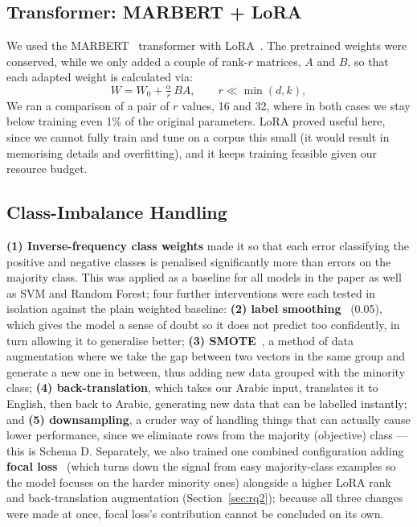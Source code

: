 \documentclass[conference]{IEEEtran}
\begin{document}
\subsection{Transformer: MARBERT + LoRA}
We used the MARBERT~\cite{abdulmageed2021marbert} transformer with LoRA~\cite{hu2022lora}.
The pretrained weights were conserved, while we only added a couple of rank-$r$ matrices,
$A$ and $B$, so that each adapted weight is calculated via:
\begin{equation}
  W = W_0 + \tfrac{\alpha}{r}\,BA, \qquad r \ll \min(d,k),
  \label{eq:lora}
\end{equation}
We ran a comparison of a pair of $r$ values, 16 and 32, where in both cases
we stay below training even 1\% of the original parameters. LoRA proved useful here,
since we cannot fully train and tune on a corpus this small (it would result in memorising
details and overfitting), and it keeps training feasible given our resource budget.

\subsection{Class-Imbalance Handling}
\label{sec:imbalance}
\textbf{(1) Inverse-frequency class weights} made it so that each error classifying the
positive and negative classes is penalised significantly more than errors on the majority class.
This was applied as a baseline for all models in the paper as well as SVM and Random Forest; four further
interventions were each tested in isolation against the plain weighted baseline:
\textbf{(2) label smoothing}~\cite{muller2019labelsmoothing} (0.05), which gives the
model a sense of doubt so it does not predict too confidently, in turn allowing it to generalise better;
\textbf{(3) SMOTE}~\cite{chawla2002smote}, a method of data augmentation where we take the gap between
two vectors in the same group and generate a new one in between, thus adding new data grouped
with the minority class; \textbf{(4) back-translation}, which takes our Arabic input, translates
it to English, then back to Arabic, generating new data that can be labelled instantly; and
\textbf{(5) downsampling}, a cruder way of handling things that can actually cause lower
performance, since we eliminate rows from the majority (objective) class --- this is Schema D.
Separately, we also trained one combined configuration adding \textbf{focal loss}~\cite{lin2017focal}
(which turns down the signal from easy majority-class examples so the model focuses on the harder
minority ones) alongside a higher LoRA rank and back-translation augmentation (Section~\ref{sec:rq2});
because all three changes were made at once, focal loss's contribution cannot be concluded on its own.
\end{document}

